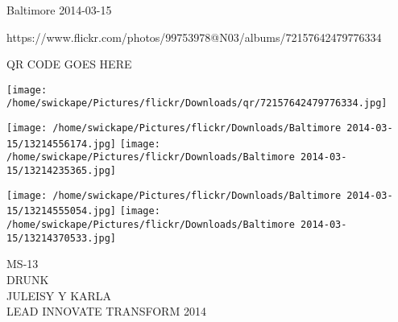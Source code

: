 \documentclass[10pt,letterpaper]{article}
\begin{document}
Baltimore 2014-03-15

https://www.flickr.com/photos/99753978@N03/albums/72157642479776334

QR CODE GOES HERE

\texttt{[image: /home/swickape/Pictures/flickr/Downloads/qr/72157642479776334.jpg]}
\pagebreak

\texttt{[image: /home/swickape/Pictures/flickr/Downloads/Baltimore 2014-03-15/13214556174.jpg]}
\texttt{[image: /home/swickape/Pictures/flickr/Downloads/Baltimore 2014-03-15/13214235365.jpg]}

\texttt{[image: /home/swickape/Pictures/flickr/Downloads/Baltimore 2014-03-15/13214555054.jpg]}
\texttt{[image: /home/swickape/Pictures/flickr/Downloads/Baltimore 2014-03-15/13214370533.jpg]}

MS{-}13\\
DRUNK\\
JULEISY Y KARLA\\
LEAD INNOVATE TRANSFORM 2014\\
\pagebreak
\end{document}
